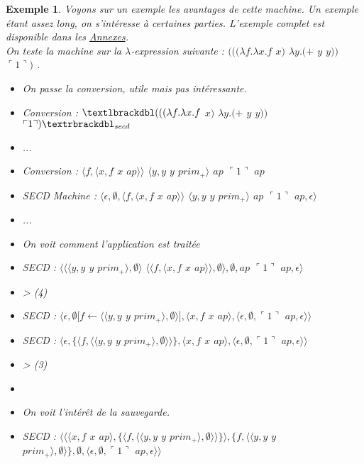 \documentclass[10pt,a4paper]{report}
\newtheorem{ex}{Exemple}
\begin{document}
	\begin{ex}
		Voyons sur un exemple les avantages de cette machine. Un exemple étant assez long, on s'intéresse à certaines parties. L'exemple complet est disponible dans les \hyperref[SECD]{Annexes}. 
		\\
		On teste la machine sur la $\lambda$-expression suivante : $(((\lambda f.\lambda x.f$ $x)$ $\lambda y.(+$ $y$ $y))$ $\ulcorner 1\urcorner)$ .
		\bigbreak
		
		\begin{itemize}
			\item[] On passe la conversion, utile mais pas intéressante.
			\item[] Conversion : $\textlbrackdbl(((\lambda f.\lambda x.f$ $x)$ $\lambda y.(+$ $y$ $y))$ $\ulcorner 1\urcorner)\textrbrackdbl_{secd}$
			\item[] ...
			\item[] Conversion : $\langle f,\langle x,f$ $x$ $ap\rangle\rangle$ $\langle y,y$ $y$ $prim_{+}\rangle$ $ap$ $\ulcorner 1\urcorner$ $ap$
			\item[] SECD Machine : $\langle\epsilon,\emptyset,\langle f,\langle x,f$ $x$ $ap\rangle\rangle$ $\langle y,y$ $y$ $prim_{+}\rangle$ $ap$ $\ulcorner 1\urcorner$ $ap,\epsilon\rangle$ 
			\item[] ...
			\item[] On voit comment l'application est traitée
			\item[] SECD : $\langle\langle\langle y,y$ $y$ $prim_{+}\rangle,\emptyset\rangle$ $\langle\langle f,\langle x,f$ $x$ $ap\rangle\rangle,\emptyset\rangle,\emptyset,ap$ $\ulcorner 1\urcorner$ $ap,\epsilon\rangle$
			\item[] > (4)
			\item[] SECD : $\langle\epsilon,\emptyset[f \leftarrow \langle\langle y,y$ $y$ $prim_{+}\rangle,\emptyset\rangle],\langle x,f$ $x$ $ap\rangle,\langle\epsilon,\emptyset,\ulcorner 1\urcorner$ $ap,\epsilon\rangle\rangle$
			\item[] SECD : $\langle\epsilon,\{\langle f,\langle\langle y,y$ $y$ $prim_{+}\rangle,\emptyset\rangle\rangle\},\langle x,f$ $x$ $ap\rangle,\langle\epsilon,\emptyset,\ulcorner 1\urcorner$ $ap,\epsilon\rangle\rangle$
			\item[] >  (3)
			\item[] 
			\item[] On voit l'intérêt de la sauvegarde.
			\item[] SECD : $\langle\langle\langle x,f$ $x$ $ap\rangle,\{\langle f,\langle\langle y,y$ $y$ $prim_{+}\rangle,\emptyset\rangle\rangle\}\rangle,\{f,\langle\langle y,y$ $y$ $prim_{+}\rangle,\emptyset\rangle\},\emptyset,\langle\epsilon,\emptyset,\ulcorner 1\urcorner$ $ap,\epsilon\rangle\rangle$

\end{itemize}
\end{ex}
\end{document}
